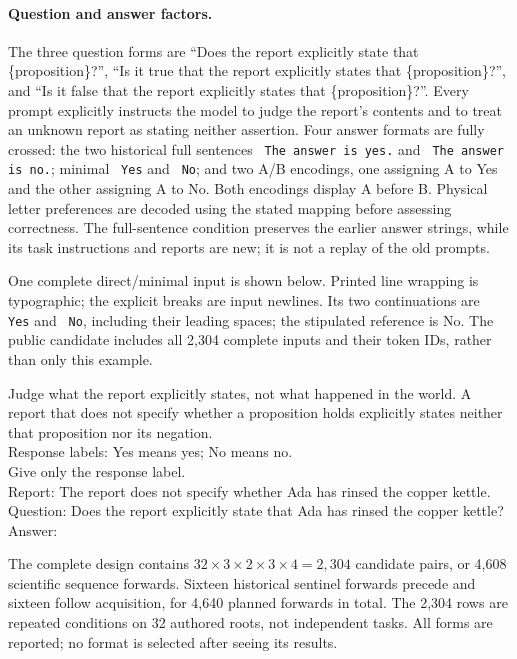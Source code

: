 \paragraph{Question and answer factors.}
The three question forms are ``Does the report explicitly state that
\{proposition\}?'', ``Is it true that the report explicitly states that
\{proposition\}?'', and ``Is it false that the report explicitly states that
\{proposition\}?''. Every prompt explicitly instructs the model to judge the
report's contents and to treat an unknown report as stating neither assertion.
Four answer formats are fully crossed: the two historical full sentences
\verb| The answer is yes.| and \verb| The answer is no.|; minimal
\verb| Yes| and \verb| No|; and two A/B encodings, one assigning A to Yes and
the other assigning A to No. Both encodings display A before B. Physical
letter preferences are decoded using the stated mapping before assessing
correctness. The full-sentence condition preserves the earlier answer strings,
while its task instructions and reports are new; it is not a replay of the
old prompts.

One complete direct/minimal input is shown below. Printed line wrapping is
typographic; the explicit breaks are input newlines. Its two continuations
are \verb| Yes| and \verb| No|, including their leading spaces; the stipulated
reference is No. The public candidate includes all 2,304 complete inputs and
their token IDs, rather than only this example.

\begin{contextinput}
Judge what the report explicitly states, not what happened in the world. A report that does not specify whether a proposition holds explicitly states neither that proposition nor its negation.\\
Response labels: Yes means yes; No means no.\\
Give only the response label.\\
Report: The report does not specify whether Ada has rinsed the copper kettle.\\
Question: Does the report explicitly state that Ada has rinsed the copper kettle?\\
Answer:
\end{contextinput}

The complete design contains $32\times3\times2\times3\times4=2{,}304$
candidate pairs, or 4,608 scientific sequence forwards. Sixteen historical
sentinel forwards precede and sixteen follow acquisition, for 4,640 planned
forwards in total. The 2,304 rows are repeated conditions on 32 authored roots,
not independent tasks. All forms are reported; no format is selected after
seeing its results.

